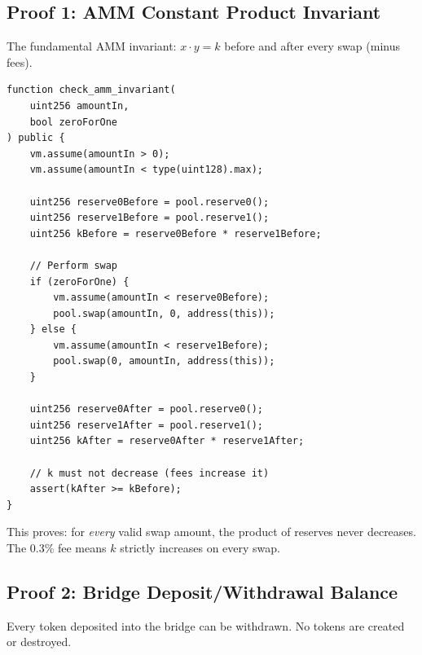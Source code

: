 \documentclass[11pt,a4paper]{article}
\begin{document}
\subsection{Proof 1: AMM Constant Product Invariant}

The fundamental AMM invariant: $x \cdot y = k$ before and after every swap (minus fees).

\begin{lstlisting}[language=Solidity,caption={AMM constant product proof}]
function check_amm_invariant(
    uint256 amountIn,
    bool zeroForOne
) public {
    vm.assume(amountIn > 0);
    vm.assume(amountIn < type(uint128).max);

    uint256 reserve0Before = pool.reserve0();
    uint256 reserve1Before = pool.reserve1();
    uint256 kBefore = reserve0Before * reserve1Before;

    // Perform swap
    if (zeroForOne) {
        vm.assume(amountIn < reserve0Before);
        pool.swap(amountIn, 0, address(this));
    } else {
        vm.assume(amountIn < reserve1Before);
        pool.swap(0, amountIn, address(this));
    }

    uint256 reserve0After = pool.reserve0();
    uint256 reserve1After = pool.reserve1();
    uint256 kAfter = reserve0After * reserve1After;

    // k must not decrease (fees increase it)
    assert(kAfter >= kBefore);
}
\end{lstlisting}

This proves: for \emph{every} valid swap amount, the product of reserves never decreases.
The 0.3\% fee means $k$ strictly increases on every swap.

\subsection{Proof 2: Bridge Deposit/Withdrawal Balance}

Every token deposited into the bridge can be withdrawn. No tokens are created or destroyed.
\end{document}
